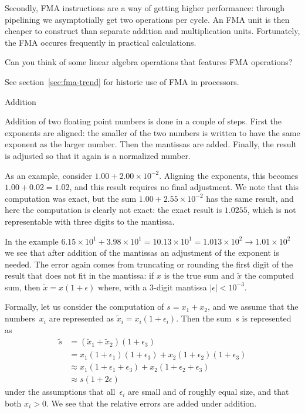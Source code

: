 Secondly, \ac{FMA} instructions are a way of getting higher
performance: through pipelining we asymptotially get two operations
per cycle. An \ac{FMA} unit is then cheaper to construct than separate
addition and multiplication units. Fortunately, the \ac{FMA} occures
frequently in practical calculations.

\begin{exercise}
  Can you think of some linear algebra operations that features
  \ac{FMA} operations?
\end{exercise}

See section~\ref{sec:fma-trend} for historic use of \ac{FMA} in processors.

 {Addition}

Addition of two floating point numbers is done in a couple of steps.
First the exponents are aligned: the smaller of the two numbers is
written to have the same exponent as the larger number. Then the
mantissas are added. Finally, the result is adjusted
so that it again is a normalized number.

As an example, consider $1.00+2.00\times 10^{-2}$. Aligning the
exponents, this becomes $1.00+0.02=1.02$, and this result requires no
final adjustment. We note that this computation was exact, but
the sum $1.00+2.55\times 10^{-2}$ has the same result, and here the
computation is clearly not exact: the exact result is $1.0255$, which
is not representable with three digits to the mantissa.

In the example $6.15\times 10^1+3.98\times 10^1=10.13\times 10^1=1.013\times
10^2\rightarrow 1.01\times 10^2$ we see that after addition of the mantissas an
adjustment of the exponent is needed. The error again comes from
truncating or rounding the first digit of the result that does not fit
in the mantissa: if $x$ is the true sum and $\tilde x$ the computed
sum, then $\tilde x=x(1+\epsilon)$ where, with a 3-digit mantissa
$|\epsilon|<10^{-3}$.

Formally, let us consider the computation of
$s=x_1+x_2$, and we assume that the numbers~$x_i$ are represented
as $\tilde x_i=x_i(1+\epsilon_i)$.
Then the sum~$s$ is represented as
\[ 
\begin{array}{rl}
\tilde s&=(\tilde x_1+\tilde x_2)(1+\epsilon_3)\\
&=x_1(1+\epsilon_1)(1+\epsilon_3)+x_2(1+\epsilon_2)(1+\epsilon_3)\\
&\approx x_1(1+\epsilon_1+\epsilon_3)+x_2(1+\epsilon_2+\epsilon_3)\\
&\approx s(1+2\epsilon)
\end{array}
\]
under the assumptions that all~$\epsilon_i$ are small and of roughly
equal size, and that both $x_i>0$.
We see that the relative errors are added under addition.

